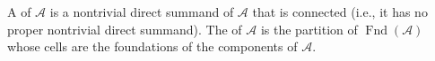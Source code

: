 A  of $\mathcal{A}$ is a nontrivial direct summand of $\mathcal{A}$ that is connected (i.e., it has no proper nontrivial direct summand). The  of $\mathcal{A}$ is the partition of $\operatorname{Fnd}(\mathcal{A})$ whose cells are the foundations of the components of $\mathcal{A}$.
